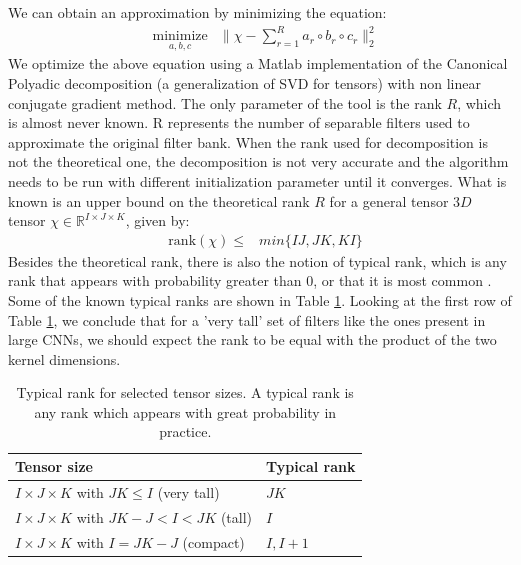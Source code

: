 \documentclass{article} %
\begin{document}
We can obtain an approximation by minimizing the equation:
\begin{equation*}
\begin{aligned}
& \underset{a,b,c}{\text{minimize}}
& \| \chi - \sum_{r=1}^{R}{a_{r}\circ b_{r}\circ c_{r}} \|_{2}^{2} 
\end{aligned}
\end{equation*}
We optimize the above equation using a Matlab implementation of the Canonical Polyadic decomposition (a generalization of  SVD for tensors) with  non linear conjugate gradient method. The only parameter of the tool is the rank $R$, which is almost never known.
R represents the number of separable filters used to approximate the original filter bank. When the rank used for decomposition is not the theoretical one, the decomposition is not very accurate and the algorithm needs to be run with different initialization parameter until it converges.
What is known is an upper bound on the theoretical rank $R$ for a  general tensor $3D$ tensor $\chi \in \mathbb{R}^{I\times J\times K}$, given by:
 \begin{equation*}
\begin{aligned}
& \text{rank}(\chi) \leq 
& min{\{IJ, JK, KI\}}
\end{aligned}
\end{equation*} 
Besides the theoretical rank, there is also the notion of typical rank, which is any rank
that appears with probability greater than 0, or that it is most common \cite{KoBa09}.
Some of the known typical ranks are shown in Table \ref{table:rank}.
Looking at the first row of Table \ref{table:rank}, we conclude that for a 'very tall' set of filters like the ones present in large CNNs, 
we should expect the rank to be equal with the product of the two kernel dimensions.
 \begin{table}
\centering
\begin{tabular}{@{}ll@{}}\toprule
Tensor size & Typical rank \\ \midrule
$I \times J \times K$ with $JK \leq I$ (very tall) & $JK$\\
$I \times J \times K$ with $JK - J < I < JK$ (tall) & $I$ \\
$I \times J \times K$ with $I = JK - J$ (compact) & $I, I+1$  \\ \bottomrule
\end{tabular}
\caption{Typical rank for selected tensor sizes. A typical rank is any rank which appears with great probability in practice.}
\label{table:rank}
\end{table}
\end{document}
